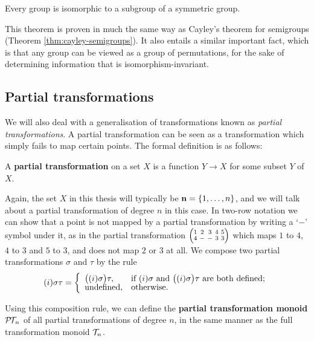 \begin{theorem}
  \label{thm:cayley-groups}
  Every group is isomorphic to a subgroup of a symmetric group.
\end{theorem}

This theorem is proven in much the same way as Cayley's theorem for semigroups
(Theorem \ref{thm:cayley-semigroups}).  It also entails a similar important
fact, which is that any group can be viewed as a group of permutations, for the
sake of determining information that is isomorphism-invariant.

\subsection{Partial transformations}
\label{sec:partial-transformations}

We will also deal with a generalisation of transformations known as
\textit{partial transformations}.  A partial transformation can be seen as a
transformation which simply fails to map certain points.  The formal definition
is as follows:

\begin{definition}
  \label{def:partial-transformation}
  A \textbf{partial transformation} on a set $X$ is a function $Y \to X$ for
  some subset $Y$ of $X$.
\end{definition}

Again, the set $X$ in this thesis will typically be $\mathbf{n} = \{1, \ldots, n\}$,
and we will talk about a partial transformation of degree $n$ in this case.  In
two-row notation we can show that a point is not mapped by a partial
transformation by writing a `$-$' symbol under it, as in the partial
transformation $\transV4--33$ which maps $1$ to $4$, $4$ to $3$ and $5$ to $3$,
and does not map $2$ or $3$ at all.  We compose two partial transformations
$\sigma$ and $\tau$ by the rule
$$(i)\sigma\tau = \left\{
  \begin{array}{l l}
    \big((i)\sigma\big)\tau,
    & \text{if~} (i)\sigma \text{~and~}
      \big((i)\sigma\big)\tau \text{~are both defined;} \\
    \text{undefined}, & \text{otherwise.}
  \end{array}
\right.$$

Using this composition rule, we can define the \textbf{partial
  transformation monoid} $\mathcal{P\!T\!}_n$ of all partial transformations of degree $n$,
in the same manner as the full transformation monoid $\mathcal{T}_n$.

